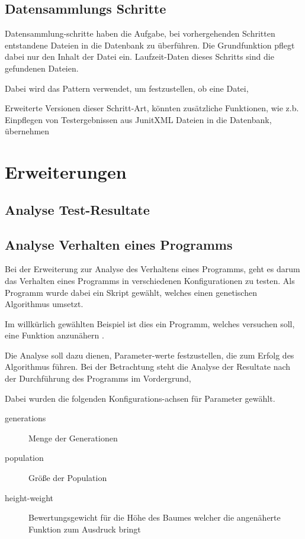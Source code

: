 \subsection{Datensammlungs Schritte}

Datensammlung-schritte haben die Aufgabe,
bei vorhergehenden Schritten entstandene Dateien 
in die Datenbank zu überführen.
Die Grundfunktion pflegt dabei nur den Inhalt der Datei ein.
Laufzeit-Daten dieses Schritts sind die gefundenen Dateien.

Dabei wird das Pattern verwendet, um festzustellen, ob eine Datei, %

Erweiterte Versionen dieser Schritt-Art, könnten zusätzliche Funktionen,
wie z.b. Einpflegen von Testergebnissen aus JunitXML Dateien in die Datenbank,
übernehmen

\section{Erweiterungen}
\subsection{Analyse Test-Resultate}




\subsection{Analyse Verhalten eines Programms}

Bei der Erweiterung zur Analyse des Verhaltens eines Programms,
geht es darum das Verhalten eines Programms
in verschiedenen Konfigurationen zu testen.
Als Programm wurde dabei ein Skript gewählt,
welches einen genetischen Algorithmus umsetzt.

Im willkürlich gewählten Beispiel ist dies ein Programm,
welches versuchen soll, eine Funktion anzunähern \cite{gen:prog}.

Die Analyse soll dazu dienen, Parameter-werte festzustellen,
die zum Erfolg des Algorithmus führen.
Bei der Betrachtung steht die Analyse der Resultate nach der Durchführung des Programms im Vordergrund,

Dabei wurden die folgenden Konfigurations-achsen für Parameter gewählt.

\begin{description}
    \item[generations] Menge der Generationen
    \item[population] Größe der Population
    \item[height-weight] Bewertungsgewicht für die Höhe des Baumes welcher die angenäherte Funktion zum Ausdruck bringt
\end{description}

